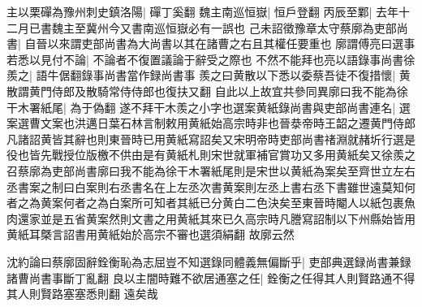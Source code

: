 主以栗磾為豫州刺史鎮洛陽|{
	磾丁奚翻}
魏主南巡恒嶽|{
	恒戶登翻}
丙辰至鄴|{
	去年十二月已書魏主至冀州今又書南巡恒嶽必有一誤也}
己未詔徵豫章太守蔡廓為吏部尚書|{
	自晉以來謂吏部尚書為大尚書以其在諸曹之右且其權任要重也}
廓謂傅亮曰選事若悉以見付不論|{
	不論者不復置議論于辭受之際也}
不然不能拜也亮以語錄事尚書徐羨之|{
	語牛倨翻錄事尚書當作録尚書事}
羨之曰黄散以下悉以委蔡吾徒不復措懷|{
	黄散謂黄門侍郎及散騎常侍侍郎也復扶又翻}
自此以上故宜共參同異廓曰我不能為徐干木署紙尾|{
	為于偽翻}
遂不拜干木羨之小字也選案黄紙錄尚書與吏部尚書連名|{
	選案選曹文案也洪邁日葉石林言制敕用黄紙始高宗時非也晉㳟帝時王韶之遷黄門侍郎凡諸詔黄皆其辭也則東晉時已用黄紙寫詔矣又宋明帝時吏部尚書禇淵就赭圻行選是役也皆先戰授位版檄不供由是有黄紙札則宋世就軍補官賞功又多用黄紙矣又徐羨之召蔡廓為吏部尚書廓曰我不能為徐干木署紙尾則是宋世以黄紙為案矣至齊世立左右丞書案之制曰白案則右丞書名在上左丞次書黄案則左丞上書右丞下書雖世遠莫知何者之為黄案何者之為白案所可知者其紙已分黄白二色決矣至東晉時閹人以紙包裹魚肉還家並是五省黄案然則文書之用黄紙其來已久高宗時凡謄寫詔制以下州縣始皆用黄紙耳槩言詔書用黄紙始於高宗不審也選須絹翻}
故廓云然

沈約論曰蔡廓固辭銓衡恥為志屈豈不知選錄同體義無偏斷乎|{
	吏部典選録尚書兼録諸曹尚書事斷丁亂翻}
良以主闇時難不欲居通塞之任|{
	銓衡之任得其人則賢路通不得其人則賢路塞塞悉則翻}
遠矣哉

